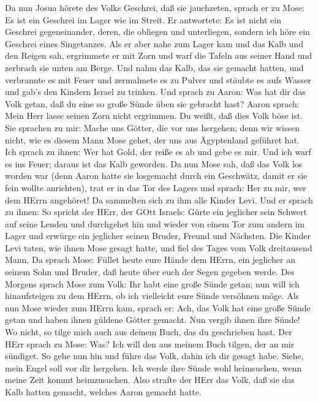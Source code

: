  Da nun Josua hörete des Volks Geschrei, daß sie
jauchzeten, sprach er zu Mose: Es ist ein Geschrei im Lager wie im
Streit.  Er antwortete: Es ist nicht ein Geschrei
gegeneinander, deren, die obliegen und unterliegen, sondern ich höre ein
Geschrei eines Singetanzes.  Als er aber nahe zum Lager kam
und das Kalb und den Reigen sah, ergrimmete er mit Zorn und warf die
Tafeln aus seiner Hand und zerbrach sie unten am Berge. 
Und nahm das Kalb, das sie gemacht hatten, und verbrannte es mit Feuer
und zermalmete es zu Pulver und stäubte es aufs Wasser und gab's den
Kindern Israel zu trinken.  Und sprach zu Aaron: Was hat
dir das Volk getan, daß du eine so große Sünde üben sie gebracht hast?
 Aaron sprach: Mein Herr lasse seinen Zorn nicht ergrimmen.
Du weißt, daß dies Volk böse ist.  Sie sprachen zu mir:
Mache uns Götter, die vor uns hergehen; denn wir wissen nicht, wie es
diesem Mann Mose gehet, der uns aus Ägyptenland geführet hat.
 Ich sprach zu ihnen: Wer hat Gold, der reiße es ab und
gebe es mir. Und ich warf es ins Feuer; daraus ist das Kalb geworden.
 Da nun Mose sah, daß das Volk los worden war (denn Aaron
hatte sie losgemacht durch ein Geschwätz, damit er sie fein wollte
anrichten),  trat er in das Tor des Lagers und sprach: Her
zu mir, wer dem HErrn angehöret! Da sammelten sich zu ihm alle Kinder
Levi.  Und er sprach zu ihnen: So spricht der HErr, der
GOtt Israels: Gürte ein jeglicher sein Schwert auf seine Lenden und
durchgehet hin und wieder von einem Tor zum andern im Lager und erwürge
ein jeglicher seinen Bruder, Freund und Nächsten.  Die
Kinder Levi taten, wie ihnen Mose gesagt hatte, und fiel des Tages vom
Volk dreitausend Mann.  Da sprach Mose: Füllet heute eure
Hände dem HErrn, ein jeglicher an seinem Sohn und Bruder, daß heute über
euch der Segen gegeben werde.  Des Morgens sprach Mose zum
Volk: Ihr habt eine große Sünde getan; nun will ich hinaufsteigen zu dem
HErrn, ob ich vielleicht eure Sünde versöhnen möge.  Als
nun Mose wieder zum HErrn kam, sprach er: Ach, das Volk hat eine große
Sünde getan und haben ihnen güldene Götter gemacht.  Nun
vergib ihnen ihre Sünde! Wo nicht, so tilge mich auch aus deinem Buch,
das du geschrieben hast.  Der HErr sprach zu Mose: Was? Ich
will den aus meinem Buch tilgen, der an mir sündiget.  So
gehe nun hin und führe das Volk, dahin ich dir gesagt habe. Siehe, mein
Engel soll vor dir hergehen. Ich werde ihre Sünde wohl heimsuchen, wenn
meine Zeit kommt heimzusuchen.  Also strafte der HErr das
Volk, daß sie das Kalb hatten gemacht, welches Aaron gemacht hatte.

